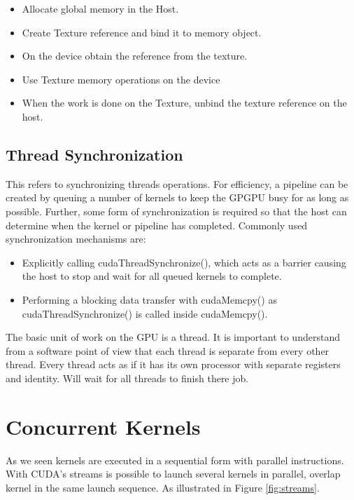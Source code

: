 \begin{itemize}
\item Allocate global memory in the Host.
\item Create Texture reference and bind it to memory object.
\item On the device obtain the reference from the texture.
\item  Use Texture memory operations on the device
\item  When the work is done on the Texture, unbind the texture reference on the host.
\end{itemize}

\subsection{Thread Synchronization}

This refers to synchronizing threads operations. For efficiency, a pipeline can be created by queuing a number of kernels to keep the GPGPU busy for as long as possible. Further, some form of synchronization is required so that the host can determine when the kernel or pipeline has completed. \cite{design} Commonly used synchronization mechanisms are:

\begin{itemize}
  \item Explicitly calling cudaThreadSynchronize(), which acts as a barrier causing the host to stop and wait for all queued kernels to complete.
  \item Performing a blocking data transfer with cudaMemcpy() as cudaThreadSynchronize() is called inside cudaMemcpy().
\end{itemize}

The basic unit of work on the GPU is a thread. It is important to understand from a software point of view that each thread is separate from every other thread. Every thread acts as if it has its own processor with separate registers and identity. Will wait for all threads to finish there job. \cite{design}

\section{Concurrent Kernels}

As we seen kernels are executed in a sequential form with parallel instructions. With CUDA's streams is possible to launch several kernels in parallel, overlap kernel in the same launch sequence. As illustrated in Figure \ref{fig:streams}.


